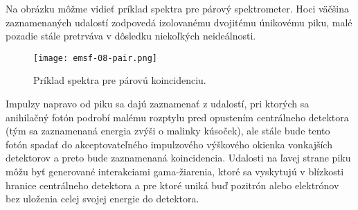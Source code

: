 \documentclass[../../main.tex]{subfiles}
\begin{document}
Na obrázku môžme vidieť príklad spektra pre párový spektrometer. Hoci väčšina zaznamenaných udalostí zodpovedá izolovanému dvojitému únikovému piku, malé pozadie stále pretrváva v dôsledku niekoľkých neideálnosti. 

\begin{figure}[!h]
\texttt{[image: emsf-08-pair.png]}
\centering
\caption{Príklad spektra pre párovú koincidenciu.}
\label{em8:fig:pair}
\end{figure}

Impulzy napravo od piku sa dajú zaznamenať z udalostí, pri ktorých sa anihilačný fotón podrobí malému rozptylu pred opustením centrálneho detektora (tým sa zaznamenaná energia zvýši o malinky kúsoček), ale stále bude tento fotón spadať do akceptovateľného impulzového výškového okienka vonkajších detektorov a preto bude zaznamenaná koincidencia. Udalosti na ľavej strane piku môžu byť generované interakciami gama-žiarenia, ktoré sa vyskytujú v blízkosti hranice centrálneho detektora a pre ktoré uniká buď pozitrón alebo elektrónov bez uloženia celej svojej energie do detektora.
\end{document}
